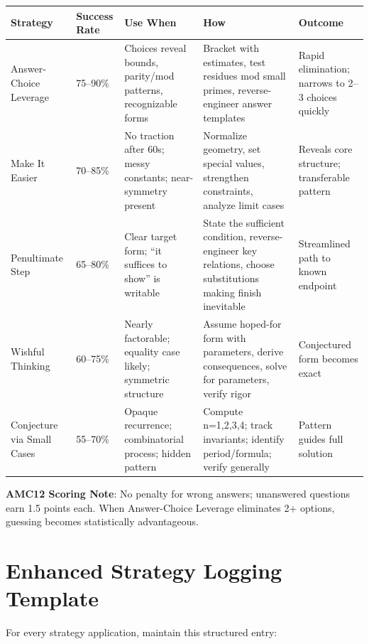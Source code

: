 \documentclass[]{article}
\begin{document}
\begin{table}[ht]
\centering
\small
\begin{tabular}{@{}p{2.5cm}p{1.5cm}p{3cm}p{3cm}p{3.5cm}@{}}
\toprule
\textbf{Strategy} & \textbf{Success Rate} & \textbf{Use When} & \textbf{How} & \textbf{Outcome} \\
\midrule
Answer-Choice Leverage & 75--90\% & Choices reveal bounds, parity/mod patterns, recognizable forms & Bracket with estimates, test residues mod small primes, reverse-engineer answer templates & Rapid elimination; narrows to 2--3 choices quickly \\
\addlinespace
Make It Easier & 70--85\% & No traction after 60s; messy constants; near-symmetry present & Normalize geometry, set special values, strengthen constraints, analyze limit cases & Reveals core structure; transferable pattern \\
\addlinespace
Penultimate Step & 65--80\% & Clear target form; ``it suffices to show'' is writable & State the sufficient condition, reverse-engineer key relations, choose substitutions making finish inevitable & Streamlined path to known endpoint \\
\addlinespace
Wishful Thinking & 60--75\% & Nearly factorable; equality case likely; symmetric structure & Assume hoped-for form with parameters, derive consequences, solve for parameters, verify rigor & Conjectured form becomes exact \\
\addlinespace
Conjecture via Small Cases & 55--70\% & Opaque recurrence; combinatorial process; hidden pattern & Compute n=1,2,3,4; track invariants; identify period/formula; verify generally & Pattern guides full solution \\
\bottomrule
\end{tabular}
\end{table}

\begin{warningbox}
\textbf{AMC12 Scoring Note}: No penalty for wrong answers; unanswered questions earn 1.5 points each. When Answer-Choice Leverage eliminates 2+ options, guessing becomes statistically advantageous.
\end{warningbox}

\section{Enhanced Strategy Logging Template}

For every strategy application, maintain this structured entry:
\end{document}
